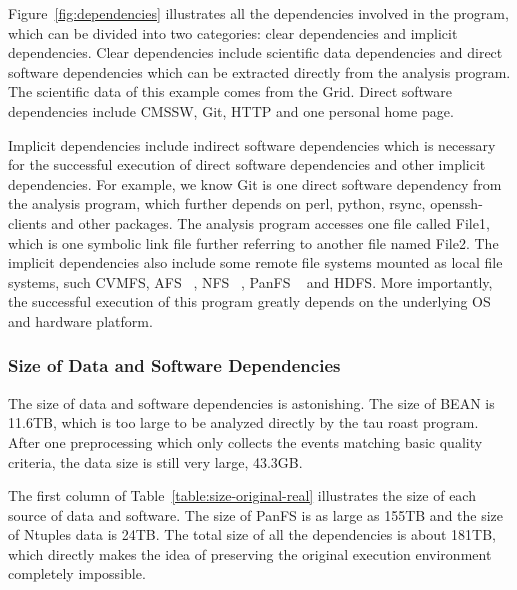 \documentclass{acm_proc_article-sp}
\begin{document}
Figure~\ref{fig:dependencies} illustrates all the dependencies
involved in the program, which can be divided into two categories: clear
dependencies and implicit dependencies. Clear dependencies include scientific data
dependencies and direct software dependencies which can be extracted directly
from the analysis program. The scientific data of this example comes from the Grid. Direct software dependencies include CMSSW, Git, HTTP and one personal home page. 

Implicit dependencies include indirect software
dependencies which is necessary for the successful execution of direct software
dependencies and other implicit dependencies. For example, we know Git is one
direct software dependency from the analysis program, which further depends on
perl, python, rsync, openssh-clients and other packages. The analysis program
accesses one file called File1, which is one symbolic link file further referring to
another file named File2.
The implicit dependencies also include some remote file systems mounted as local file systems, such CVMFS, AFS ~\cite{howard1988scale}, NFS ~\cite{sandberg1985design}, PanFS ~\cite{welch2008scalable} and HDFS.
More importantly, the successful execution of this program greatly depends on the underlying OS and hardware platform.

\subsubsection{Size of Data and Software Dependencies}
The size of data and software dependencies is astonishing.
The size of BEAN is 11.6TB, which is too large to be analyzed directly by the tau roast program. After one preprocessing which only collects the events matching basic quality criteria, the data size is still very large, 43.3GB. 

The first column of Table~\ref{table:size-original-real} illustrates the size of each source of data and software. The size of PanFS is as large as 155TB and the size of Ntuples data is 24TB. The total size of all the dependencies is about 181TB, which directly makes the idea of preserving the original execution environment completely impossible.
\end{document}
